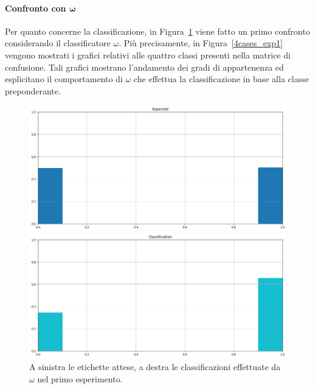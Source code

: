 \documentclass[12pt]{report}
\theoremstyle{definition}
\begin{document}
\paragraph{Confronto con $\bm{\omega}$}
Per quanto concerne la classificazione, in Figura~\ref{classification_exp1} viene fatto un primo confronto considerando il classificatore $\omega$. 
Più precisamente, in Figura~\ref{4cases_exp1} vengono mostrati i grafici relativi alle quattro classi presenti nella matrice di confusione.
Tali grafici mostrano l'andamento dei gradi di appartenenza ed esplicitano il comportamento di $\omega$ che effettua la classificazione in base alla classe preponderante.
\begin{figure}
\centering
    \begin{minipage}{0.48\textwidth}
        \includegraphics[width=\linewidth]{images/experiment_uniform_disgiunti/expected_classification.png}
    \end{minipage}
    \begin{minipage}{0.48\textwidth}
        \includegraphics[width=\linewidth]{images/experiment_uniform_disgiunti/prediction_classification.png}
    \end{minipage}
    \caption{A sinistra le etichette attese, a destra le classificazioni effettuate da $\omega$ nel primo esperimento.}
    \label{classification_exp1}
\end{figure}
\end{document}
